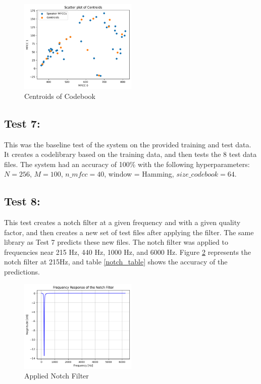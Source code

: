\documentclass[conference]{IEEEtran}
\begin{document}
    \begin{figure}
        \centering
        \label{centroids}
        \includegraphics[width=0.5\textwidth]{centroids.png}
        \caption{Centroids of Codebook}
    \end{figure}

    \subsection*{Test 7:}
    This was the baseline test of the system on the provided training and test data. It creates a codelibrary based on the training data, and then tests the 8 test data files. The system had an accuracy of 100\% with the following hyperparameters: $N = 256$, $M = 100$, $n\_mfcc = 40$, window = Hamming, $size\_codebook = 64$.

    \subsection*{Test 8:}
    This test creates a notch filter at a given frequency and with a given quality factor, and then creates a new set of test files after applying the filter. The same library as Test 7 predicts these new files. The notch filter was applied to frequencies near 215 Hz, 440 Hz, 1000 Hz, and 6000 Hz. Figure \ref{notch} represents the notch filter at 215Hz, and table \ref{notch_table} shows the accuracy of the predictions.

    \begin{figure}
        \centering
        \label{notch}
        \includegraphics[width=0.5\textwidth]{notchfilter.png}
        \caption{Applied Notch Filter}
    \end{figure}
\end{document}
